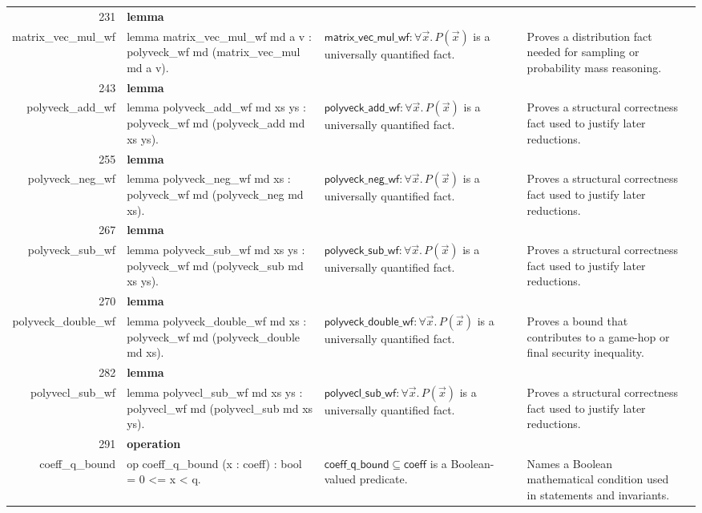 \documentclass[10pt]{article}
\newcommand{\ec}[1]{\begingroup\ttfamily\scriptsize #1\endgroup}
\begin{document}
\begin{longtable}{r L{0.17\textwidth} L{0.26\textwidth} L{0.27\textwidth} L{0.20\textwidth}}
231 & \textbf{lemma}\\\ec{matrix\_vec\_mul\_wf} & \ec{lemma matrix\_vec\_mul\_wf md a v : polyveck\_wf md (matrix\_vec\_mul md a v).} & \(\mathsf{matrix\_vec\_mul\_wf} : \forall \vec{x}.\, P(\vec{x})\) is a universally quantified fact. & Proves a distribution fact needed for sampling or probability mass reasoning. \\
243 & \textbf{lemma}\\\ec{polyveck\_add\_wf} & \ec{lemma polyveck\_add\_wf md xs ys : polyveck\_wf md (polyveck\_add md xs ys).} & \(\mathsf{polyveck\_add\_wf} : \forall \vec{x}.\, P(\vec{x})\) is a universally quantified fact. & Proves a structural correctness fact used to justify later reductions. \\
255 & \textbf{lemma}\\\ec{polyveck\_neg\_wf} & \ec{lemma polyveck\_neg\_wf md xs : polyveck\_wf md (polyveck\_neg md xs).} & \(\mathsf{polyveck\_neg\_wf} : \forall \vec{x}.\, P(\vec{x})\) is a universally quantified fact. & Proves a structural correctness fact used to justify later reductions. \\
267 & \textbf{lemma}\\\ec{polyveck\_sub\_wf} & \ec{lemma polyveck\_sub\_wf md xs ys : polyveck\_wf md (polyveck\_sub md xs ys).} & \(\mathsf{polyveck\_sub\_wf} : \forall \vec{x}.\, P(\vec{x})\) is a universally quantified fact. & Proves a structural correctness fact used to justify later reductions. \\
270 & \textbf{lemma}\\\ec{polyveck\_double\_wf} & \ec{lemma polyveck\_double\_wf md xs : polyveck\_wf md (polyveck\_double md xs).} & \(\mathsf{polyveck\_double\_wf} : \forall \vec{x}.\, P(\vec{x})\) is a universally quantified fact. & Proves a bound that contributes to a game-hop or final security inequality. \\
282 & \textbf{lemma}\\\ec{polyvecl\_sub\_wf} & \ec{lemma polyvecl\_sub\_wf md xs ys : polyvecl\_wf md (polyvecl\_sub md xs ys).} & \(\mathsf{polyvecl\_sub\_wf} : \forall \vec{x}.\, P(\vec{x})\) is a universally quantified fact. & Proves a structural correctness fact used to justify later reductions. \\
291 & \textbf{operation}\\\ec{coeff\_q\_bound} & \ec{op coeff\_q\_bound (x : coeff) : bool = 0 <= x < q.} & \(\mathsf{coeff\_q\_bound} \subseteq \mathsf{coeff}\) is a Boolean-valued predicate. & Names a Boolean mathematical condition used in statements and invariants. \\

\end{longtable}
\end{document}
